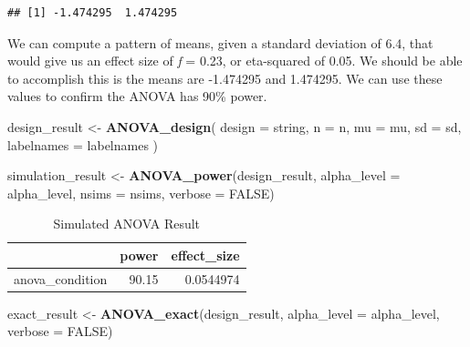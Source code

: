 \documentclass[
]{book}
\newenvironment{Shaded}{\begin{snugshade}}{\end{snugshade}}
\newcommand{\DataTypeTok}[1]{\textcolor[rgb]{0.13,0.29,0.53}{#1}}
\newcommand{\KeywordTok}[1]{\textcolor[rgb]{0.13,0.29,0.53}{\textbf{#1}}}
\newcommand{\NormalTok}[1]{#1}
\newcommand{\OtherTok}[1]{\textcolor[rgb]{0.56,0.35,0.01}{#1}}
\newcommand{\StringTok}[1]{\textcolor[rgb]{0.31,0.60,0.02}{#1}}
\begin{document}
\begin{verbatim}
## [1] -1.474295  1.474295
\end{verbatim}

We can compute a pattern of means, given a standard deviation of 6.4, that would give us an effect size of \emph{f} = 0.23, or eta-squared of 0.05. We should be able to accomplish this is the means are -1.474295 and 1.474295. We can use these values to confirm the ANOVA has 90\% power.

\begin{Shaded}
\begin{Highlighting}[]
\NormalTok{design_result <-}\StringTok{ }\KeywordTok{ANOVA_design}\NormalTok{(}
  \DataTypeTok{design =}\NormalTok{ string,}
  \DataTypeTok{n =}\NormalTok{ n,}
  \DataTypeTok{mu =}\NormalTok{ mu,}
  \DataTypeTok{sd =}\NormalTok{ sd,}
  \DataTypeTok{labelnames =}\NormalTok{ labelnames}
\NormalTok{  )}
\end{Highlighting}
\end{Shaded}

\begin{Shaded}
\begin{Highlighting}[]
\NormalTok{simulation_result <-}\StringTok{ }\KeywordTok{ANOVA_power}\NormalTok{(design_result, }
                                 \DataTypeTok{alpha_level =}\NormalTok{ alpha_level, }
                                 \DataTypeTok{nsims =}\NormalTok{ nsims,}
                                 \DataTypeTok{verbose =} \OtherTok{FALSE}\NormalTok{)}
\end{Highlighting}
\end{Shaded}

\begin{table}[!h]

\caption{\label{tab:unnamed-chunk-21}Simulated ANOVA Result}
\centering
\begin{tabular}[t]{l|r|r}
\hline
  & power & effect\_size\\
\hline
anova\_condition & 90.15 & 0.0544974\\
\hline
\end{tabular}
\end{table}

\begin{Shaded}
\begin{Highlighting}[]
\NormalTok{exact_result <-}\StringTok{ }\KeywordTok{ANOVA_exact}\NormalTok{(design_result,}
                            \DataTypeTok{alpha_level =}\NormalTok{ alpha_level,}
                            \DataTypeTok{verbose =} \OtherTok{FALSE}\NormalTok{)}
\end{Highlighting}
\end{Shaded}
\end{document}
